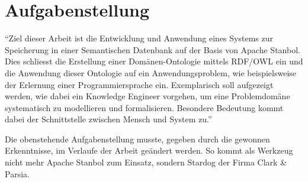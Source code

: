 \chapter{Aufgabenstellung}
\label{chap:Aufgabenstellung}


"`Ziel dieser Arbeit ist die Entwicklung und Anwendung eines Systems zur Speicherung in einer Semantischen Datenbank auf der Basis von Apache Stanbol. Dies schliesst die Erstellung einer Domänen-Ontologie mittels RDF/OWL ein und die Anwendung dieser Ontologie auf ein Anwendungsproblem, wie beispielsweise der Erlernung einer Programmiersprache ein. Exemplarisch soll aufgezeigt werden, wie dabei ein Knowledge Engineer vorgehen, um eine Problemdomäne systematisch zu modellieren und formalisieren. Besondere Bedeutung kommt dabei der Schnittstelle zwischen Mensch und System zu."'~\cite{Aufgabenstellung}

Die obenstehende Aufgabenstellung musste, gegeben durch die gewonnen Erkenntnisse, im Verlaufe der Arbeit geändert werden. So kommt als Werkzeug nicht mehr Apache Stanbol zum Einsatz, sondern Stardog der Firma Clark \& Parsia.
